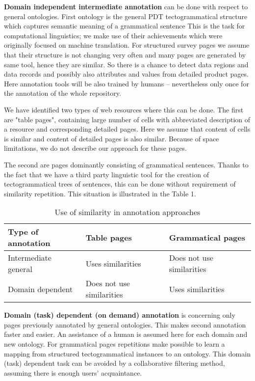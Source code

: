 \documentclass{sig-alternate}
\begin{document}
\textbf{Domain independent intermediate annotation} can be done with respect to general ontologies. First ontology is the general PDT tectogrammatical structure which captures semantic meaning of a grammatical sentence This is the task for computational linguistics; we make use of their achievements which were originally focused on machine translation. For structured survey pages we assume that their structure is not changing very often and many pages are generated by same tool, hence they are similar. So there is a chance to detect data regions and data records and possibly also attributes and values from detailed product pages. Here annotation tools will be also trained by humans -- nevertheless only once for the annotation of the whole repository.\par
We have identified two types of web resources where this can be done. The first are "table pages", containing large number of cells with abbreviated description of a resource and corresponding detailed pages. Here we assume that content of cells is similar and content of detailed pages is also similar. Because of space limitations, we do not describe our approach for these pages.\par
The second are pages dominantly consisting of grammatical sentences. Thanks to the fact that we have a third party linguistic tool for the creation of tectogrammatical trees of sentences, this can be done without requirement of similarity repetition. This situation is illustrated in the Table 1.


\begin{table}
{\tiny
\begin{tabular}{|p{60pt}|p{60pt}|p{60pt}|} \hline
Type of annotation&Table pages&Grammatical pages\\ \hline
Intermediate general&Uses similarities&Does not use similarities\\ \hline
Domain dependent&Does not use similarities&Uses similarities\\ \hline
\end{tabular}}
\label{table1}
\caption{Use of similarity in annotation approaches}
\end{table} 

\textbf{Domain (task) dependent (on demand) annotation} is concerning only pages previously annotated by general ontologies. This makes second annotation faster and easier. An assistance of a human is assumed here for each domain and new ontology. For grammatical pages repetitions make possible to learn a mapping from structured tectogrammatical instances to an ontology. This domain (task) dependent task can be avoided by a collaborative filtering method, assuming there is enough users' acquaintance. \par
\end{document}
